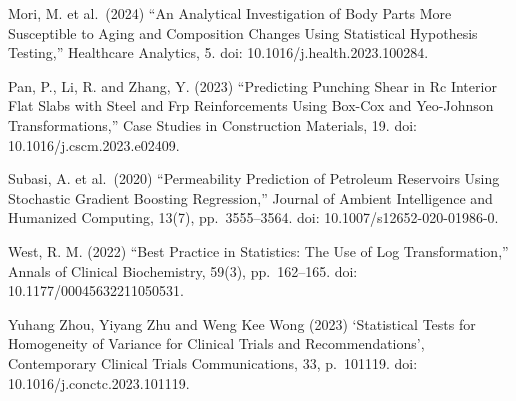 \documentclass[
  letterpaper,
  DIV=11,
  numbers=noendperiod,
  oneside]{scrartcl}
\begin{document}
Mori, M. et al.~(2024) ``An Analytical Investigation of Body Parts More
Susceptible to Aging and Composition Changes Using Statistical
Hypothesis Testing,'' Healthcare Analytics, 5. doi:
10.1016/j.health.2023.100284.

Pan, P., Li, R. and Zhang, Y. (2023) ``Predicting Punching Shear in Rc
Interior Flat Slabs with Steel and Frp Reinforcements Using Box-Cox and
Yeo-Johnson Transformations,'' Case Studies in Construction Materials,
19. doi: 10.1016/j.cscm.2023.e02409.

Subasi, A. et al.~(2020) ``Permeability Prediction of Petroleum
Reservoirs Using Stochastic Gradient Boosting Regression,'' Journal of
Ambient Intelligence and Humanized Computing, 13(7), pp.~3555--3564.
doi: 10.1007/s12652-020-01986-0.

West, R. M. (2022) ``Best Practice in Statistics: The Use of Log
Transformation,'' Annals of Clinical Biochemistry, 59(3), pp.~162--165.
doi: 10.1177/00045632211050531.

Yuhang Zhou, Yiyang Zhu and Weng Kee Wong (2023) `Statistical Tests for
Homogeneity of Variance for Clinical Trials and Recommendations',
Contemporary Clinical Trials Communications, 33, p.~101119. doi:
10.1016/j.conctc.2023.101119.
\end{document}
